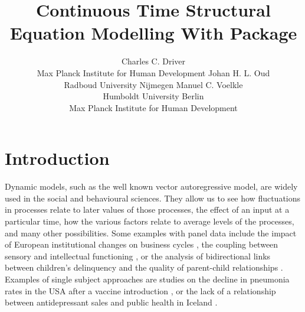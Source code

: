 \documentclass[nojss]{jss}\usepackage[]{graphicx}\usepackage[]{color}
\author{Charles C. Driver \\ Max Planck Institute for Human Development \And 
Johan H. L. Oud \\ Radboud University Nijmegen \AND
Manuel C. Voelkle \\ Humboldt University Berlin \\ Max Planck Institute for Human Development}
\title{Continuous Time Structural Equation Modelling With \proglang{R} Package \pkg{ctsem}}
\begin{document}



\section[Introduction]{Introduction}\nopagebreak
Dynamic models, such as the well known vector autoregressive model, are widely used in the social and behavioural sciences. They allow us to see how fluctuations in processes relate to later values of those processes, the effect of an input at a particular time, how the various factors relate to average levels of the processes, and many other possibilities.
Some examples with panel data include the impact of European institutional changes on business cycles \citep{canova2012institutional}, the coupling between sensory and intellectual functioning \citep{ghisletta2005exploring}, or the analysis of bidirectional links between children's delinquency and the quality of parent-child relationships \citep{keijsers2011bidirectional}. 
Examples of single subject approaches are studies on the decline in pneumonia rates in the USA after a vaccine introduction \citep{grijalva2007decline}, or the lack of a relationship between antidepressant sales and public health in Iceland \citep{helgason2004antidepressants}. 
\end{document}
